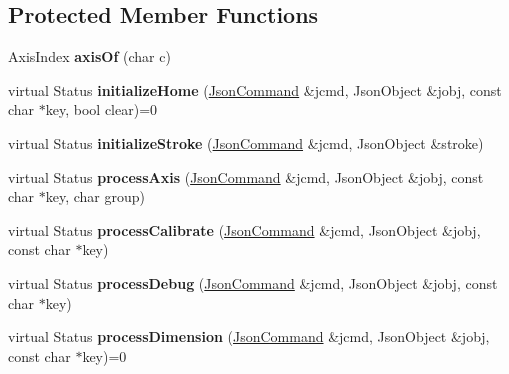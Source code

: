 \subsection*{Protected Member Functions}
\begin{DoxyCompactItemize}
\item 
\hypertarget{classfirestep_1_1_json_controller_af7d36ec60276471ee6b57d857778aa28}{Axis\+Index {\bfseries axis\+Of} (char c)}\label{classfirestep_1_1_json_controller_af7d36ec60276471ee6b57d857778aa28}

\item 
\hypertarget{classfirestep_1_1_json_controller_a5c1043d5d57d4e1d9c9a77f35d0aeca6}{virtual Status {\bfseries initialize\+Home} (\hyperlink{classfirestep_1_1_json_command}{Json\+Command} \&jcmd, Json\+Object \&jobj, const char $\ast$key, bool clear)=0}\label{classfirestep_1_1_json_controller_a5c1043d5d57d4e1d9c9a77f35d0aeca6}

\item 
\hypertarget{classfirestep_1_1_json_controller_a239c567f49d1b693fcdc5ee8399bceed}{virtual Status {\bfseries initialize\+Stroke} (\hyperlink{classfirestep_1_1_json_command}{Json\+Command} \&jcmd, Json\+Object \&stroke)}\label{classfirestep_1_1_json_controller_a239c567f49d1b693fcdc5ee8399bceed}

\item 
\hypertarget{classfirestep_1_1_json_controller_a55dccd5b44896199a0d29d5e8e9e6493}{virtual Status {\bfseries process\+Axis} (\hyperlink{classfirestep_1_1_json_command}{Json\+Command} \&jcmd, Json\+Object \&jobj, const char $\ast$key, char group)}\label{classfirestep_1_1_json_controller_a55dccd5b44896199a0d29d5e8e9e6493}

\item 
\hypertarget{classfirestep_1_1_json_controller_a98972901221d243c92e1344adab52d29}{virtual Status {\bfseries process\+Calibrate} (\hyperlink{classfirestep_1_1_json_command}{Json\+Command} \&jcmd, Json\+Object \&jobj, const char $\ast$key)}\label{classfirestep_1_1_json_controller_a98972901221d243c92e1344adab52d29}

\item 
\hypertarget{classfirestep_1_1_json_controller_aa64294812025ca87c3e3550b4a481720}{virtual Status {\bfseries process\+Debug} (\hyperlink{classfirestep_1_1_json_command}{Json\+Command} \&jcmd, Json\+Object \&jobj, const char $\ast$key)}\label{classfirestep_1_1_json_controller_aa64294812025ca87c3e3550b4a481720}

\item 
\hypertarget{classfirestep_1_1_json_controller_a8651e8746ec0178e6755bb33ccace7e9}{virtual Status {\bfseries process\+Dimension} (\hyperlink{classfirestep_1_1_json_command}{Json\+Command} \&jcmd, Json\+Object \&jobj, const char $\ast$key)=0}\label{classfirestep_1_1_json_controller_a8651e8746ec0178e6755bb33ccace7e9}


\end{DoxyCompactItemize}
